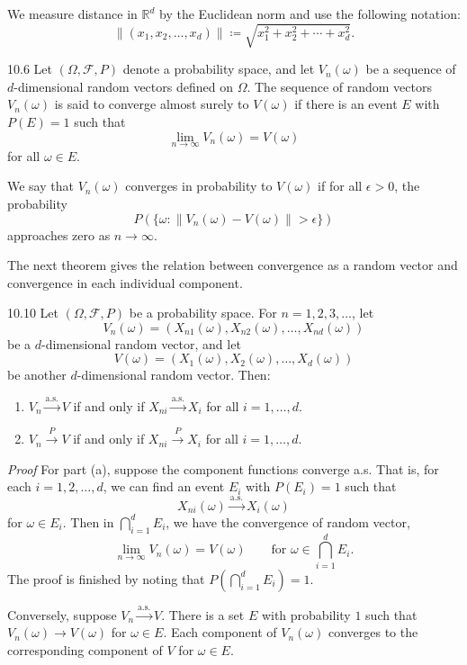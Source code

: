 We measure distance in $\mathbb{R}^d$ by the Euclidean norm and use the following notation:
\[
\lVert(x_1,x_2,\ldots,x_d)\rVert
\coloneqq
\sqrt{x_1^2+x_2^2+\cdots+x_d^2}.
\]

\begin{defbox}{10.6}
Let $(\Omega,\mathcal{F},P)$ denote a probability space, and let $V_n(\omega)$ be a sequence of $d$-dimensional random vectors defined on $\Omega$. The sequence of random vectors $V_n(\omega)$ is said to converge almost surely to $V(\omega)$ if there is an event $E$ with $P(E)=1$ such that
\[
\lim_{n\to\infty}V_n(\omega)=V(\omega)
\]
for all $\omega\in E$.

We say that $V_n(\omega)$ converges in probability to $V(\omega)$ if for all $\epsilon>0$, the probability
\[
P(\{\omega:\lVert V_n(\omega)-V(\omega)\rVert>\epsilon\})
\]
approaches zero as $n\to\infty$.
\end{defbox}

The next theorem gives the relation between convergence as a random vector and convergence in each individual component.

\begin{thmbox}{10.10}
Let $(\Omega,\mathcal{F},P)$ be a probability space. For $n=1,2,3,\ldots$, let
\[
V_n(\omega)=(X_{n1}(\omega),X_{n2}(\omega),\ldots,X_{nd}(\omega))
\]
be a $d$-dimensional random vector, and let
\[
V(\omega)=(X_1(\omega),X_2(\omega),\ldots,X_d(\omega))
\]
be another $d$-dimensional random vector. Then:
\begin{enumerate}
\item $V_n\xrightarrow{\mathrm{a.s.}}V$ if and only if $X_{ni}\xrightarrow{\mathrm{a.s.}}X_i$ for all $i=1,\ldots,d$.
\item $V_n\xrightarrow{P}V$ if and only if $X_{ni}\xrightarrow{P}X_i$ for all $i=1,\ldots,d$.
\end{enumerate}
\end{thmbox}

\textit{Proof}
For part (a), suppose the component functions converge a.s. That is, for each $i=1,2,\ldots,d$, we can find an event $E_i$ with $P(E_i)=1$ such that
\[
X_{ni}(\omega)\xrightarrow{\mathrm{a.s.}}X_i(\omega)
\]
for $\omega\in E_i$. Then in $\bigcap_{i=1}^{d}E_i$, we have the convergence of random vector,
\[
\lim_{n\to\infty}V_n(\omega)=V(\omega)
\qquad\text{for }\omega\in\bigcap_{i=1}^{d}E_i.
\]
The proof is finished by noting that $P(\bigcap_{i=1}^{d}E_i)=1$.

Conversely, suppose $V_n\xrightarrow{\mathrm{a.s.}}V$. There is a set $E$ with probability $1$ such that $V_n(\omega)\to V(\omega)$ for $\omega\in E$. Each component of $V_n(\omega)$ converges to the corresponding component of $V$ for $\omega\in E$.

